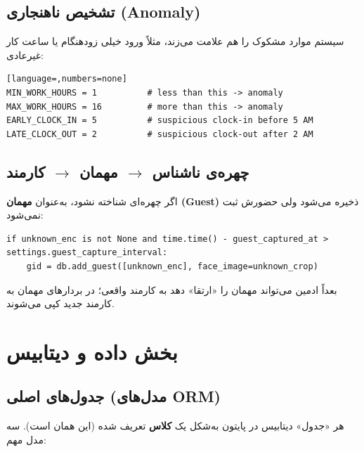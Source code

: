 \documentclass[12pt,a4paper]{article}
\begin{document}
\subsection{تشخیص ناهنجاری (Anomaly)}
سیستم موارد مشکوک را هم علامت می‌زند، مثلاً ورود خیلی زودهنگام یا ساعت کار غیرعادی:

\begin{latin}
\begin{lstlisting}[language=,numbers=none]
MIN_WORK_HOURS = 1          # less than this -> anomaly
MAX_WORK_HOURS = 16         # more than this -> anomaly
EARLY_CLOCK_IN = 5          # suspicious clock-in before 5 AM
LATE_CLOCK_OUT = 2          # suspicious clock-out after 2 AM
\end{lstlisting}
\end{latin}

\subsection{چهره‌ی ناشناس $\rightarrow$ مهمان $\rightarrow$ کارمند}
اگر چهره‌ای شناخته نشود، به‌عنوان \textbf{مهمان (Guest)} ذخیره می‌شود ولی حضورش ثبت نمی‌شود:

\begin{latin}
\begin{lstlisting}
if unknown_enc is not None and time.time() - guest_captured_at > settings.guest_capture_interval:
    gid = db.add_guest([unknown_enc], face_image=unknown_crop)
\end{lstlisting}
\end{latin}

بعداً ادمین می‌تواند مهمان را «ارتقا» دهد به کارمند واقعی؛ در  بردارهای مهمان به کارمند جدید کپی می‌شوند.

\section{بخش داده و دیتابیس}

\subsection{جدول‌های اصلی (مدل‌های ORM)}
هر «جدول» دیتابیس در پایتون به‌شکل یک \textbf{کلاس} تعریف شده (این همان  است). سه مدل مهم:
\end{document}
